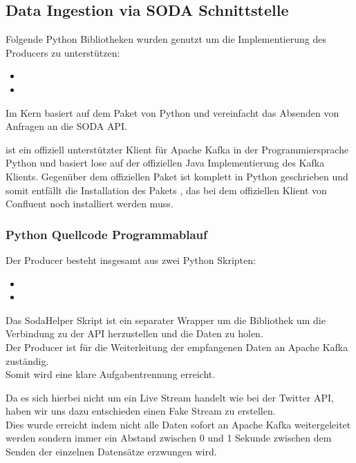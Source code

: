 \subsection{Data Ingestion via \acs{SODA} Schnittstelle}

Folgende Python Bibliotheken wurden genutzt um die Implementierung des Producers zu unterstützen:

\begin{itemize}
  \item {}
  \item {}
\end{itemize}

Im Kern basiert  auf dem  Paket von Python und vereinfacht das Absenden von Anfragen an die \ac{SODA} \ac{API}.\autocite{Sodapy}

 ist ein offiziell unterstützter Klient für Apache Kafka in der Programmiersprache Python und basiert lose auf der offiziellen Java Implementierung des Kafka Klients.\autocite{KafkaPython}
Gegenüber dem offiziellen Paket  ist  komplett in Python geschrieben und somit entfällt die Installation des Pakets ,
das bei dem offiziellen Klient von Confluent noch installiert werden muss.\autocite{KafkaClients}

\subsubsection{Python Quellcode Programmablauf}
Der Producer besteht insgesamt aus zwei Python Skripten:

\begin{itemize}
  \item {}
  \item {}
\end{itemize}

Das SodaHelper Skript ist ein separater Wrapper um die  Bibliothek um die Verbindung zu der \ac{API} herzustellen und die Daten zu holen.
\\
Der Producer ist für die Weiterleitung der empfangenen Daten an Apache Kafka zuständig.
\\
Somit wird eine klare Aufgabentrennung erreicht.

Da es sich hierbei nicht um ein Live Stream handelt wie \zb{} bei der Twitter \ac{API}, haben wir uns dazu entschieden einen \glqq Fake Stream\grqq{} zu erstellen.
\\
Dies wurde erreicht indem nicht alle Daten sofort an Apache Kafka weitergeleitet werden sondern immer ein Abstand zwischen 0 und 1 Sekunde zwischen dem Senden der einzelnen Datensätze
erzwungen wird.


